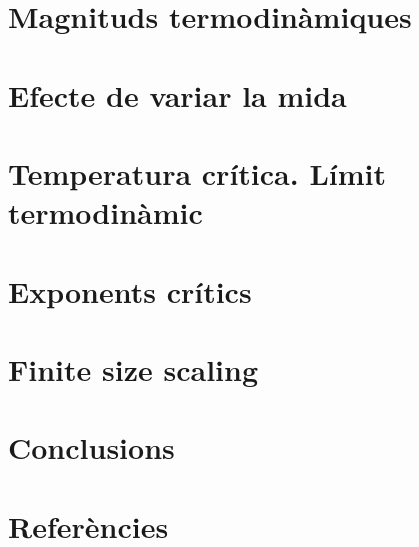 \documentclass[a4paper]{article}
\begin{document}
\section{Magnituds termodinàmiques}

\section{Efecte de variar la mida}

\section{Temperatura crítica. Límit termodinàmic}

\section{Exponents crítics}

\section{Finite size scaling}

\section{Conclusions}

\section{Referències}
\end{document}
